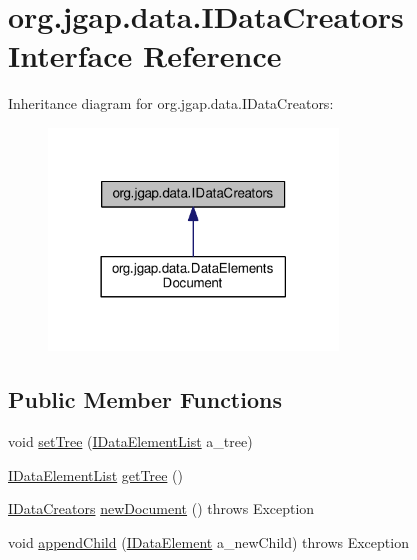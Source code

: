 \hypertarget{interfaceorg_1_1jgap_1_1data_1_1_i_data_creators}{\section{org.\-jgap.\-data.\-I\-Data\-Creators Interface Reference}
\label{interfaceorg_1_1jgap_1_1data_1_1_i_data_creators}
}


Inheritance diagram for org.\-jgap.\-data.\-I\-Data\-Creators\-:
\nopagebreak
\begin{figure}[H]
\begin{center}
\leavevmode
\includegraphics[width=218pt]{interfaceorg_1_1jgap_1_1data_1_1_i_data_creators__inherit__graph}
\end{center}
\end{figure}
\subsection*{Public Member Functions}
\begin{DoxyCompactItemize}
\item 
void \hyperlink{interfaceorg_1_1jgap_1_1data_1_1_i_data_creators_a32e7a8cdb24dc711695bf6a30958e2a1}{set\-Tree} (\hyperlink{interfaceorg_1_1jgap_1_1data_1_1_i_data_element_list}{I\-Data\-Element\-List} a\-\_\-tree)
\item 
\hyperlink{interfaceorg_1_1jgap_1_1data_1_1_i_data_element_list}{I\-Data\-Element\-List} \hyperlink{interfaceorg_1_1jgap_1_1data_1_1_i_data_creators_a855f68f8b856831a6c1416a1452d6982}{get\-Tree} ()
\item 
\hyperlink{interfaceorg_1_1jgap_1_1data_1_1_i_data_creators}{I\-Data\-Creators} \hyperlink{interfaceorg_1_1jgap_1_1data_1_1_i_data_creators_ab7ea3686a4fdd18f93b91d93c6b94176}{new\-Document} ()  throws Exception
\item 
void \hyperlink{interfaceorg_1_1jgap_1_1data_1_1_i_data_creators_a458cfa2f50530cb8929d804975c0338c}{append\-Child} (\hyperlink{interfaceorg_1_1jgap_1_1data_1_1_i_data_element}{I\-Data\-Element} a\-\_\-new\-Child)  throws Exception
\end{DoxyCompactItemize}
